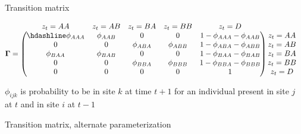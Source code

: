 \documentclass[
  12pt,
]{krantz}
\begin{document}
Transition matrix

\[
\begin{matrix}
& \\
\mathbf{\Gamma} =
\left ( \vphantom{ \begin{matrix} 12 \\ 12 \\ 12 \\ 12 \\ 12\end{matrix} } \right .
\end{matrix}
\hspace{-1.2em}
\begin{matrix}
z_t=AA & z_t=AB & z_t=BA & z_t=BB & z_t=D \\ \hdashline
\phi_{AAA} & \phi_{AAB} & 0 & 0 & 1 - \phi_{AAA} - \phi_{AAB}\\
0 & 0 & \phi_{ABA} & \phi_{ABB} & 1 - \phi_{ABA} - \phi_{ABB}\\
\phi_{BAA} & \phi_{BAB} & 0 & 0 & 1 - \phi_{BAA} - \phi_{BAB}\\
0 & 0 & \phi_{BBA} & \phi_{BBB} & 1 - \phi_{BBA} - \phi_{BBB}\\
0 & 0 & 0 & 0 & 1
\end{matrix}
\hspace{-0.2em}
\begin{matrix}
& \\
\left . \vphantom{ \begin{matrix} 12 \\ 12 \\ 12 \\ 12 \\ 12\end{matrix} } \right )
\begin{matrix}
z_t=AA \\ z_t=AB \\ z_t=BA \\ z_t=BB \\ z_t=D
\end{matrix}
\end{matrix}
\]

\(\phi_{ijk}\) is probability to be in site \(k\) at time \(t + 1\) for an individual
present in site \(j\) at \(t\) and in site \(i\) at \(t - 1\)

Transition matrix, alternate parameterization
\end{document}
